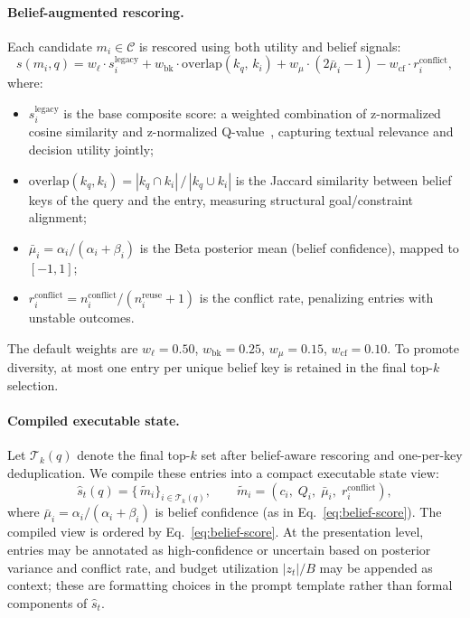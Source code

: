 \paragraph{Belief-augmented rescoring.}
Each candidate $m_i \in \mathcal{C}$ is rescored using both utility and belief signals:
\begin{equation}
\label{eq:belief-score}
  s(m_i, q) =
    w_{\ell} \cdot s_i^{\mathrm{legacy}}
  + w_{\mathrm{bk}} \cdot \mathrm{overlap}(k_q,\, k_i)
  + w_{\mu} \cdot (2\bar{\mu}_i - 1)
  - w_{\mathrm{cf}} \cdot r_i^{\mathrm{conflict}},
\end{equation}
where:
\begin{itemize}
  \item $s_i^{\mathrm{legacy}}$ is the base composite score: a weighted combination of z-normalized cosine similarity and z-normalized Q-value~\citep{zhang2026memrl}, capturing textual relevance and decision utility jointly;
  \item $\mathrm{overlap}(k_q, k_i) = |k_q \cap k_i| \,/\, |k_q \cup k_i|$ is the Jaccard similarity between belief keys of the query and the entry, measuring structural goal/constraint alignment;
  \item $\bar{\mu}_i = \alpha_i / (\alpha_i + \beta_i)$ is the Beta posterior mean (belief confidence), mapped to $[-1, 1]$;
  \item $r_i^{\mathrm{conflict}} = n_i^{\mathrm{conflict}} / (n_i^{\mathrm{reuse}} + 1)$ is the conflict rate, penalizing entries with unstable outcomes.
\end{itemize}
The default weights are $w_\ell {=} 0.50$, $w_{\mathrm{bk}} {=} 0.25$, $w_{\mu} {=} 0.15$, $w_{\mathrm{cf}} {=} 0.10$. To promote diversity, at most one entry per unique belief key is retained in the final top-$k$ selection.

\paragraph{Compiled executable state.}
Let $\mathcal{T}_k(q)$ denote the final top-$k$ set after belief-aware rescoring and one-per-key deduplication. We compile these entries into a compact executable state view:
\begin{equation}
\label{eq:compiled-view}
  \hat{s}_t(q) = \bigl\{\, \tilde{m}_i \bigr\}_{i \in \mathcal{T}_k(q)}, \qquad
  \tilde{m}_i = (c_i,\; Q_i,\; \bar{\mu}_i,\; r_i^{\mathrm{conflict}}),
\end{equation}
where $\bar{\mu}_i = \alpha_i / (\alpha_i + \beta_i)$ is belief confidence (as in Eq.~\ref{eq:belief-score}). The compiled view is ordered by Eq.~\ref{eq:belief-score}. At the presentation level, entries may be annotated as high-confidence or uncertain based on posterior variance and conflict rate, and budget utilization $|z_t|/B$ may be appended as context; these are formatting choices in the prompt template rather than formal components of $\hat{s}_t$.

